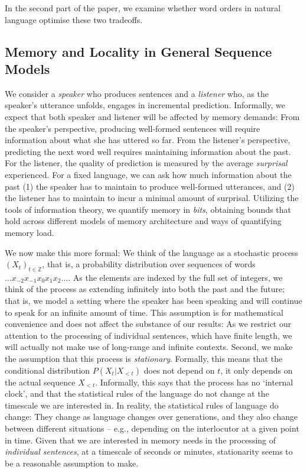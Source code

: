 \documentclass[11pt,letterpaper]{article}
\begin{document}
In the second part of the paper, we examine whether word orders in natural language optimise these two tradeoffs.


\subsection{Memory and Locality in General Sequence Models}

We consider a \emph{speaker} who produces sentences and a \emph{listener} who, as the speaker's utterance unfolds, engages in incremental prediction.
Informally, we expect that both speaker and listener will be affected by memory demands:
From the speaker's perspective, producing well-formed sentences will require information about what she has uttered so far.
From the listener's perspective, predicting the next word well requires maintaining information about the past.
For the listener, the quality of prediction is measured by the average \emph{surprisal} experienced.
For a fixed language, we can ask how much information about the past (1) the speaker has to maintain to produce well-formed utterances, and (2) the listener has to maintain to incur a minimal amount of surprisal.
Utilizing the tools of information theory, we quantify memory in \emph{bits}, obtaining bounds that hold across different models of memory architecture and ways of quantifying memory load.




We now make this more formal:
We think of the language as a stochastic process $(X_t)_{t \in \mathbb{Z}}$, that is, a probability distribution over sequences of words $\dots x_{-2} x_{-1} x_0 x_{1} x_{2} \dots$.
As the elements are indexed by the full set of integers, we think of the process as extending infinitely into both the past and the future; that is, we model a setting where the speaker has been speaking and will continue to speak for an infinite amount of time.
This assumption is for mathematical convenience and does not affect the substance of our results: As we restrict our attention to the processing of individual sentences, which have finite length, we will actually not make use of long-range and infinite contexts.
Second, we make the assumption that this process is \emph{stationary}.
Formally, this means that the conditional distribution $P(X_t|X_{<t})$ does not depend on $t$, it only depends on the actual sequence $X_{<t}$.
Informally, this says that the process has no `internal clock', and that the statistical rules of the language do not change at the timescale we are interested in.
In reality, the statistical rules of language do change: They change as language changes over generations, and they also change between different situations -- e.g., depending on the interlocutor at a given point in time.
Given that we are interested in memory needs in the processing of \emph{individual sentences}, at a timescale of seconds or minutes, stationarity seems to be a reasonable assumption to make.
\end{document}

